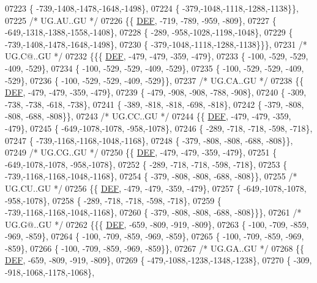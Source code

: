 \begin{DoxyCode}
07223 \{ -739,-1408,-1478,-1648,-1498\},
07224 \{ -379,-1048,-1118,-1288,-1138\}\},
07225 \textcolor{comment}{/* UG.AU..GU */}
07226 \{\{  \mbox{\hyperlink{1_88_84__epars_8h_a397419fc12b37ed479c8abb9d444d843}{DEF}}, -719, -789, -959, -809\},
07227 \{ -649,-1318,-1388,-1558,-1408\},
07228 \{ -289, -958,-1028,-1198,-1048\},
07229 \{ -739,-1408,-1478,-1648,-1498\},
07230 \{ -379,-1048,-1118,-1288,-1138\}\}\},
07231 \textcolor{comment}{/* UG.C@..GU */}
07232 \{\{\{  \mbox{\hyperlink{1_88_84__epars_8h_a397419fc12b37ed479c8abb9d444d843}{DEF}}, -479, -479, -359, -479\},
07233 \{ -100, -529, -529, -409, -529\},
07234 \{ -100, -529, -529, -409, -529\},
07235 \{ -100, -529, -529, -409, -529\},
07236 \{ -100, -529, -529, -409, -529\}\},
07237 \textcolor{comment}{/* UG.CA..GU */}
07238 \{\{  \mbox{\hyperlink{1_88_84__epars_8h_a397419fc12b37ed479c8abb9d444d843}{DEF}}, -479, -479, -359, -479\},
07239 \{ -479, -908, -908, -788, -908\},
07240 \{ -309, -738, -738, -618, -738\},
07241 \{ -389, -818, -818, -698, -818\},
07242 \{ -379, -808, -808, -688, -808\}\},
07243 \textcolor{comment}{/* UG.CC..GU */}
07244 \{\{  \mbox{\hyperlink{1_88_84__epars_8h_a397419fc12b37ed479c8abb9d444d843}{DEF}}, -479, -479, -359, -479\},
07245 \{ -649,-1078,-1078, -958,-1078\},
07246 \{ -289, -718, -718, -598, -718\},
07247 \{ -739,-1168,-1168,-1048,-1168\},
07248 \{ -379, -808, -808, -688, -808\}\},
07249 \textcolor{comment}{/* UG.CG..GU */}
07250 \{\{  \mbox{\hyperlink{1_88_84__epars_8h_a397419fc12b37ed479c8abb9d444d843}{DEF}}, -479, -479, -359, -479\},
07251 \{ -649,-1078,-1078, -958,-1078\},
07252 \{ -289, -718, -718, -598, -718\},
07253 \{ -739,-1168,-1168,-1048,-1168\},
07254 \{ -379, -808, -808, -688, -808\}\},
07255 \textcolor{comment}{/* UG.CU..GU */}
07256 \{\{  \mbox{\hyperlink{1_88_84__epars_8h_a397419fc12b37ed479c8abb9d444d843}{DEF}}, -479, -479, -359, -479\},
07257 \{ -649,-1078,-1078, -958,-1078\},
07258 \{ -289, -718, -718, -598, -718\},
07259 \{ -739,-1168,-1168,-1048,-1168\},
07260 \{ -379, -808, -808, -688, -808\}\}\},
07261 \textcolor{comment}{/* UG.G@..GU */}
07262 \{\{\{  \mbox{\hyperlink{1_88_84__epars_8h_a397419fc12b37ed479c8abb9d444d843}{DEF}}, -659, -809, -919, -809\},
07263 \{ -100, -709, -859, -969, -859\},
07264 \{ -100, -709, -859, -969, -859\},
07265 \{ -100, -709, -859, -969, -859\},
07266 \{ -100, -709, -859, -969, -859\}\},
07267 \textcolor{comment}{/* UG.GA..GU */}
07268 \{\{  \mbox{\hyperlink{1_88_84__epars_8h_a397419fc12b37ed479c8abb9d444d843}{DEF}}, -659, -809, -919, -809\},
07269 \{ -479,-1088,-1238,-1348,-1238\},
07270 \{ -309, -918,-1068,-1178,-1068\},

\end{DoxyCode}
